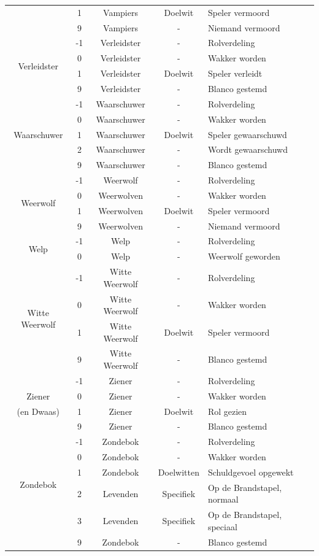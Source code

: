 \documentclass[12pt]{article}
\begin{document}
\begin{center}
\begin{longtable}{c|c|c|c|l}
       & 1 & Vampiers & Doelwit & Speler vermoord \\
       & 9 & Vampiers & - & Niemand vermoord \\
      \hline
      \multirow{4}{*}{Verleidster} & -1 & Verleidster & - & Rolverdeling \\
       & 0 & Verleidster & - & Wakker worden \\
       & 1 & Verleidster & Doelwit & Speler verleidt \\
       & 9 & Verleidster & - & Blanco gestemd \\
      \hline
      \multirow{5}{*}{Waarschuwer} & -1 & Waarschuwer & - & Rolverdeling \\
       & 0 & Waarschuwer & - & Wakker worden \\
       & 1 & Waarschuwer & Doelwit & Speler gewaarschuwd \\
       & 2 & Waarschuwer & - & Wordt gewaarschuwd \\
       & 9 & Waarschuwer & - & Blanco gestemd \\
      \hline
      \multirow{4}{*}{Weerwolf} & -1 & Weerwolf & - & Rolverdeling \\
       & 0 & Weerwolven & - & Wakker worden \\
       & 1 & Weerwolven & Doelwit & Speler vermoord \\
       & 9 & Weerwolven & - & Niemand vermoord \\
      \hline
      \multirow{2}{*}{Welp} & -1 & Welp & - & Rolverdeling \\
       & 0 & Welp & - & Weerwolf geworden \\
      \hline
      \multirow{4}{*}{Witte Weerwolf} & -1 & Witte Weerwolf & - & Rolverdeling \\
       & 0 & Witte Weerwolf & - & Wakker worden \\
       & 1 & Witte Weerwolf & Doelwit & Speler vermoord \\
       & 9 & Witte Weerwolf & - & Blanco gestemd \\
      \hline
       & -1 & Ziener & - & Rolverdeling \\
      Ziener & 0 & Ziener & - & Wakker worden \\
      (en Dwaas) & 1 & Ziener & Doelwit & Rol gezien \\
       & 9 & Ziener & - & Blanco gestemd \\
      \hline
      \multirow{5}{*}{Zondebok} & -1 & Zondebok & - & Rolverdeling \\
       & 0 & Zondebok & - & Wakker worden \\
       & 1 & Zondebok & Doelwitten & Schuldgevoel opgewekt \\
       & 2 & Levenden & Specifiek & Op de Brandstapel, normaal \\
       & 3 & Levenden & Specifiek & Op de Brandstapel, speciaal \\
       & 9 & Zondebok & - & Blanco gestemd \\
    \end{longtable}
  \end{center}
\end{document}
